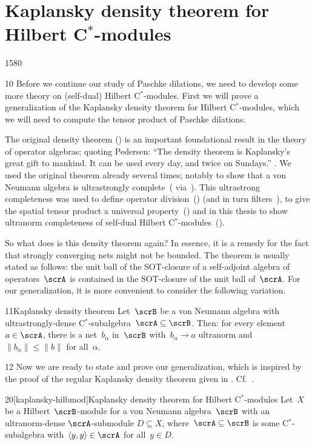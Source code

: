 
\section{Kaplansky density theorem for Hilbert C$^*$-modules}
\begin{parsec}{1580}%
\begin{point}{10}%
Before we continue our study of Paschke dilations,
    we need to develop some more theory on (self-dual) Hilbert C$^*$-modules.
First we will prove a generalization of the Kaplansky density
    theorem for Hilbert C$^*$-modules,
    which we will need to compute the tensor product of Paschke dilations.

The original density theorem ()
    is an important foundational result
    in the theory of operator algebras;
    quoting Pedersen:
    ``The density theorem is Kaplansky's great gift to mankind.
    It can be used every day, and twice on
    Sundays.'' \cite[\S2.3.4]{pedersen1979c}.
We used the original theorem already several times;
    notably to show that
        a von Neumann algebra is
        ultrastrongly complete~(
        via~).
This ultrastrong completeness was used
    to define operator division~()
        (and in turn filters~),
        to give the spatial tensor product a universal
        property~()
    and in this thesis to show ultranorm completeness
        of self-dual Hilbert C$^*$-modules~().

So what does is this density theorem again?
In essence, it is a remedy for the fact
    that strongly converging nets might not be bounded.
The theorem is usually stated as follows:
    the unit ball of the SOT-closure of a self-adjoint algebra
    of operators~$\scrA$
    is contained in the SOT-closure of the unit ball of~$\scrA$.
For our generalization, it is more convenient to consider the following
    variation.
\end{point}
\begin{point}{11}{Kaplansky density theorem}%
Let~$\scrB$ be a von Neumann algebra with ultrastrongly-dense
    C$^*$-subalgebra~$\scrA  \subseteq \scrB$.
Then: for every element~$a \in \scrA$,
    there is a net~$b_\alpha$ in~$\scrB$
    with~$b_\alpha \to a$ ultranorm
    and~$\|b_\alpha\| \leq \|b\|$ for all~$\alpha$.
\end{point}
\begin{point}{12}%
Now we are ready to state and prove our generalization,
    which is inspired by the proof of the regular Kaplansky density theorem
    given in \cite[thm.~1.2.2]{arveson2012invitation}.
Cf.~.
\end{point}
\begin{point}{20}[kaplansky-hilbmod]{Kaplansky density theorem for Hilbert C$^*$-modules}%
Let~$X$ be a Hilbert~$\scrB$-module for a von Neumann algebra~$\scrB$
    with an ultranorm-dense $\scrA$-submodule $D \subseteq X$,
    where~$\scrA \subseteq \scrB$ is some C$^*$-subalgebra
    with~$\langle y,y \rangle \in \scrA$ for all~$y \in D$.


\end{point}
\end{parsec}
